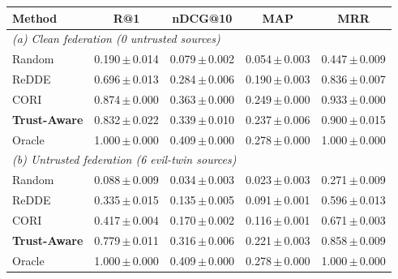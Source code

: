 \begin{tabular}{l cccc}
\toprule
Method & R@1 & nDCG@10 & MAP & MRR \\
\midrule
\multicolumn{5}{l}{\emph{(a) Clean federation (0 untrusted sources)}}\\
\midrule
Random & 0.190\,$\pm$\,0.014 & 0.079\,$\pm$\,0.002 & 0.054\,$\pm$\,0.003 & 0.447\,$\pm$\,0.009 \\
ReDDE & 0.696\,$\pm$\,0.013 & 0.284\,$\pm$\,0.006 & 0.190\,$\pm$\,0.003 & 0.836\,$\pm$\,0.007 \\
CORI & 0.874\,$\pm$\,0.000 & 0.363\,$\pm$\,0.000 & 0.249\,$\pm$\,0.000 & 0.933\,$\pm$\,0.000 \\
\textbf{Trust-Aware} & 0.832\,$\pm$\,0.022 & 0.339\,$\pm$\,0.010 & 0.237\,$\pm$\,0.006 & 0.900\,$\pm$\,0.015 \\
Oracle & 1.000\,$\pm$\,0.000 & 0.409\,$\pm$\,0.000 & 0.278\,$\pm$\,0.000 & 1.000\,$\pm$\,0.000 \\
\midrule
\multicolumn{5}{l}{\emph{(b) Untrusted federation (6 evil-twin sources)}}\\
\midrule
Random & 0.088\,$\pm$\,0.009 & 0.034\,$\pm$\,0.003 & 0.023\,$\pm$\,0.003 & 0.271\,$\pm$\,0.009 \\
ReDDE & 0.335\,$\pm$\,0.015 & 0.135\,$\pm$\,0.005 & 0.091\,$\pm$\,0.001 & 0.596\,$\pm$\,0.013 \\
CORI & 0.417\,$\pm$\,0.004 & 0.170\,$\pm$\,0.002 & 0.116\,$\pm$\,0.001 & 0.671\,$\pm$\,0.003 \\
\textbf{Trust-Aware} & 0.779\,$\pm$\,0.011 & 0.316\,$\pm$\,0.006 & 0.221\,$\pm$\,0.003 & 0.858\,$\pm$\,0.009 \\
Oracle & 1.000\,$\pm$\,0.000 & 0.409\,$\pm$\,0.000 & 0.278\,$\pm$\,0.000 & 1.000\,$\pm$\,0.000 \\
\bottomrule
\end{tabular}

